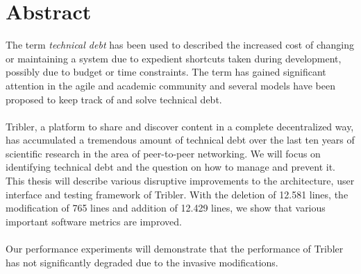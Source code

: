 \chapter*{Abstract}
The term \emph{technical debt} has been used to described the increased cost of changing or maintaining a system due to expedient shortcuts taken during development, possibly due to budget or time constraints. The term has gained significant attention in the agile and academic community and several models have been proposed to keep track of and solve technical debt.\\\\
Tribler, a platform to share and discover content in a complete decentralized way, has accumulated a tremendous amount of technical debt over the last ten years of scientific research in the area of peer-to-peer networking. We will focus on identifying technical debt and the question on how to manage and prevent it. This thesis will describe various disruptive improvements to the architecture, user interface and testing framework of Tribler. With the deletion of 12.581 lines, the modification of 765 lines and addition of 12.429 lines, we show that various important software metrics are improved.\\\\
Our performance experiments will demonstrate that the performance of Tribler has not significantly degraded due to the invasive modifications.